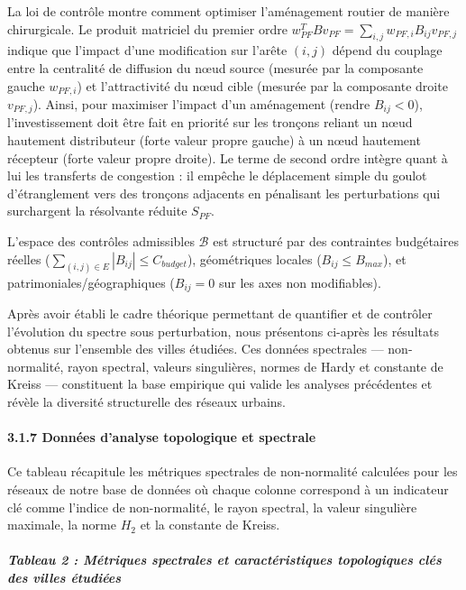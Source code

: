 \documentclass[10pt, a4paper]{article}
\begin{document}
La loi de contrôle montre comment optimiser l'aménagement routier de
manière chirurgicale. Le produit matriciel du premier ordre
\(w_{PF}^T B v_{PF} = \sum_{i,j} w_{PF, i} B_{ij} v_{PF, j}\) indique
que l'impact d'une modification sur l'arête \((i, j)\) dépend du
couplage entre la centralité de diffusion du nœud source (mesurée par la
composante gauche \(w_{PF, i}\)) et l'attractivité du nœud cible
(mesurée par la composante droite \(v_{PF, j}\)). Ainsi, pour maximiser
l'impact d'un aménagement (rendre \(B_{ij} < 0\)), l'investissement doit
être fait en priorité sur les tronçons reliant un nœud hautement
distributeur (forte valeur propre gauche) à un nœud hautement récepteur
(forte valeur propre droite). Le terme de second ordre intègre quant à
lui les transferts de congestion : il empêche le déplacement simple du
goulot d'étranglement vers des tronçons adjacents en pénalisant les
perturbations qui surchargent la résolvante réduite \(S_{PF}\).

L'espace des contrôles admissibles \(\mathcal{B}\) est structuré par des
contraintes budgétaires réelles
(\(\sum_{(i,j) \in E} |B_{ij}| \le C_{budget}\)), géométriques locales
(\(B_{ij} \le B_{max}\)), et patrimoniales/géographiques (\(B_{ij} = 0\)
sur les axes non modifiables).

Après avoir établi le cadre théorique permettant de quantifier et de
contrôler l'évolution du spectre sous perturbation, nous présentons
ci-après les résultats obtenus sur l'ensemble des villes étudiées. Ces
données spectrales --- non-normalité, rayon spectral, valeurs
singulières, normes de Hardy et constante de Kreiss --- constituent la
base empirique qui valide les analyses précédentes et révèle la
diversité structurelle des réseaux urbains.

\paragraph{3.1.7 Données d'analyse topologique et
spectrale}\label{donnuxe9es-danalyse-topologique-et-spectrale}

Ce tableau récapitule les métriques spectrales de non-normalité
calculées pour les réseaux de notre base de données où chaque colonne
correspond à un indicateur clé comme l'indice de non-normalité, le rayon
spectral, la valeur singulière maximale, la norme \(H_2\) et la
constante de Kreiss.

\subparagraph{Tableau 2 : Métriques spectrales et caractéristiques
topologiques clés des villes
étudiées}\label{tableau-2-muxe9triques-spectrales-et-caractuxe9ristiques-topologiques-cluxe9s-des-villes-uxe9tudiuxe9es}
\end{document}
